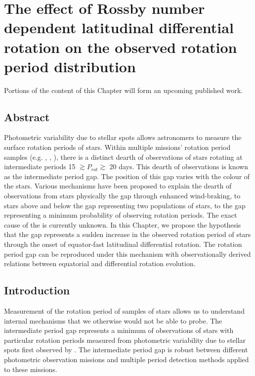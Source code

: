 \chapter{The effect of Rossby number dependent latitudinal differential rotation on the observed rotation period distribution}
\label{chap:period_gap}

Portions of the content of this Chapter will form an upcoming published work.

\section*{Abstract}

Photometric variability due to stellar spots allows astronomers to measure the surface rotation periods of stars.
Within multiple missions' rotation period samples (e.g. \kepler, \ktoo, \ZTF), there is a distinct dearth of observations of stars rotating at intermediate periods 15 $\gtrsim P_{rot} \gtrsim$ 20 days.
This dearth of observations is known as the intermediate period gap.
The position of this gap varies with the colour of the stars.
Various mechanisms have been proposed to explain the dearth of observations from stars physically  the gap through enhanced wind-braking, to stars above and below the gap representing two populations of stars, to the gap representing a minimum probability of observing rotation periods.
The exact cause of the  is currently unknown.
In this Chapter, we propose the hypothesis that the gap represents a sudden increase in the observed rotation period of stars through the onset of equator-fast latitudinal differential rotation.
The rotation period gap can be reproduced under this mechanism with observationally derived relations between equatorial and differential rotation evolution.

\newpage

\section{Introduction}
\label{sec:intro}

Measurement of the rotation period of samples of stars allows us to understand internal mechanisms that we otherwise would not be able to probe.
The intermediate period gap represents a minimum of observations of stars with particular rotation periods measured from photometric variability due to stellar spots first observed by \citet{mcquillan_rotation_2014}.
The intermediate period gap is robust between different photometric observation missions \citep{mcquillan_rotation_2014,davenport_rotating_2017,davenport_rotating_2018,lu_bridging_2022} and multiple period detection methods applied to these missions.

